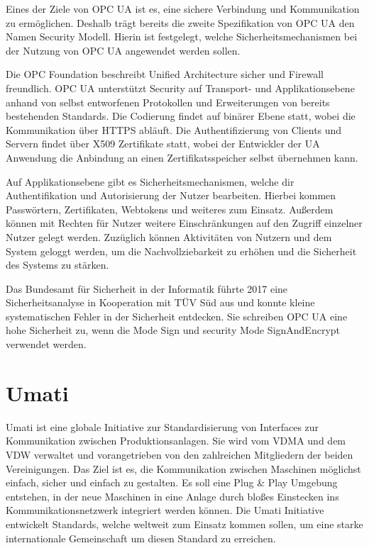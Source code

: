 \documentclass[a4paper, 12pt, oneside]{scrbook}
\begin{document}
		
		Eines der Ziele von OPC UA ist es, eine sichere Verbindung und Kommunikation zu ermöglichen. Deshalb trägt bereits die zweite Spezifikation von OPC UA den Namen 
		\glqq Security Modell\grqq. Hierin ist festgelegt, welche Sicherheitsmechanismen bei der Nutzung von OPC UA angewendet werden sollen.
		
		Die OPC Foundation beschreibt Unified Architecture sicher und Firewall freundlich. OPC UA unterstützt Security auf Transport- und Applikationsebene anhand von selbst entworfenen Protokollen und Erweiterungen von bereits bestehenden Standards. Die Codierung findet auf binärer Ebene statt, wobei die Kommunikation über HTTPS abläuft. Die Authentifizierung von Clients und Servern findet über X509 Zertifikate statt, wobei der Entwickler der UA Anwendung die Anbindung an einen Zertifikatsspeicher selbst übernehmen kann. \cite{noauthor_unified_nodate, noauthor_opc_nodate}
		
		Auf Applikationsebene gibt es Sicherheitsmechanismen, welche dir Authentifikation und Autorisierung der Nutzer bearbeiten. Hierbei kommen Passwörtern, Zertifikaten, Webtokens und weiteres zum Einsatz. Außerdem können mit Rechten für Nutzer weitere Einschränkungen auf den Zugriff einzelner Nutzer gelegt werden. Zuzüglich können Aktivitäten von Nutzern und dem System geloggt werden, um die Nachvollziebarkeit zu erhöhen und die Sicherheit des Systems zu stärken. \cite{noauthor_unified_nodate, noauthor_opc_nodate}
		
		Das Bundesamt für Sicherheit in der Informatik führte 2017 eine Sicherheitsanalyse in Kooperation mit TÜV Süd aus und konnte kleine systematischen Fehler in der Sicherheit entdecken. Sie schreiben OPC UA eine hohe Sicherheit zu, wenn die  Mode Sign und security Mode SignAndEncrypt verwendet werden. \cite{damm_opc_2017}
		
		
	
	\section{Umati}
		
		
		Umati ist eine globale Initiative zur Standardisierung von Interfaces zur Kommunikation zwischen Produktionsanlagen. Sie wird vom \ac{VDMA} und dem \ac{VDW} verwaltet und vorangetrieben von den zahlreichen Mitgliedern der beiden Vereinigungen. Das Ziel ist es, die Kommunikation zwischen Maschinen möglichst einfach, sicher und einfach zu gestalten. Es soll eine Plug \& Play Umgebung entstehen, in der neue Maschinen in eine Anlage durch bloßes Einstecken ins Kommunikationsnetzwerk integriert werden können. Die Umati Initiative entwickelt Standards, welche weltweit zum Einsatz kommen sollen, um eine starke internationale Gemeinschaft um diesen Standard zu erreichen. \cite{noauthor_umati_2023}
		
\end{document}
